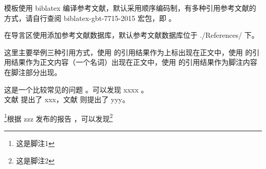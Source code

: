 模板使用 biblatex 编译参考文献，默认采用顺序编码制，有多种引用参考文献的方式，请自行查阅 biblatex-gbt-7715-2015 宏包，即 。

在导言区使用\clist{}添加参考文献数据库，默认参考文献数据库位于 ./References/ 下。

这里主要举例三种引用方式，使用  的引用结果作为上标出现在正文中，使用  的引用结果作为正文内容（一个名词）出现在正文中，使用  的引用结果作为脚注内容在脚注部分出现。



\begin{texcode}[]{}
  这是一个比较常见的问题 \cite{barella_situ_2021}。可以发现 xxxx \cite{atta_enhanced_2021}。\\

  文献\parencite{张燕2013电气自动化在电气工程中的应用探讨} 提出了 xxx，文献 \parencite{黄雪芳2012探讨电气工程中自动化技术的应用} 则提出了 yyy。

\end{texcode}

\footnote{这是脚注1}根据 zzz 发布的报告 ，可以发现\footnote{这是脚注2}